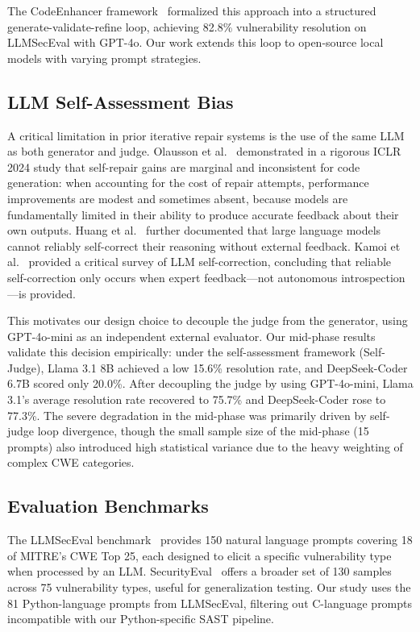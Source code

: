 \documentclass[runningheads]{llncs}
\begin{document}
The CodeEnhancer framework~\cite{lee2026codeenhancer} formalized this approach into a structured generate-validate-refine loop, achieving 82.8\% vulnerability resolution on LLMSecEval with GPT-4o. Our work extends this loop to open-source local models with varying prompt strategies.

\subsection{LLM Self-Assessment Bias}

A critical limitation in prior iterative repair systems is the use of the same LLM as both generator and judge. Olausson et al.~\cite{olausson2024selfrepair} demonstrated in a rigorous ICLR 2024 study that self-repair gains are marginal and inconsistent for code generation: when accounting for the cost of repair attempts, performance improvements are modest and sometimes absent, because models are fundamentally limited in their ability to produce accurate feedback about their own outputs. Huang et al.~\cite{huang2023large} further documented that large language models cannot reliably self-correct their reasoning without external feedback. Kamoi et al.~\cite{kamoi2024when} provided a critical survey of LLM self-correction, concluding that reliable self-correction only occurs when expert feedback---not autonomous introspection---is provided.

This motivates our design choice to decouple the judge from the generator, using GPT-4o-mini as an independent external evaluator. Our mid-phase results validate this decision empirically: under the self-assessment framework (Self-Judge), Llama 3.1 8B achieved a low 15.6\% resolution rate, and DeepSeek-Coder 6.7B scored only 20.0\%. After decoupling the judge by using GPT-4o-mini, Llama 3.1's average resolution rate recovered to 75.7\% and DeepSeek-Coder rose to 77.3\%. The severe degradation in the mid-phase was primarily driven by self-judge loop divergence, though the small sample size of the mid-phase (15 prompts) also introduced high statistical variance due to the heavy weighting of complex CWE categories.

\subsection{Evaluation Benchmarks}

The LLMSecEval benchmark~\cite{tony2023llmseceval} provides 150 natural language prompts covering 18 of MITRE's CWE Top 25, each designed to elicit a specific vulnerability type when processed by an LLM. SecurityEval~\cite{siddiq2022securityeval} offers a broader set of 130 samples across 75 vulnerability types, useful for generalization testing. Our study uses the 81 Python-language prompts from LLMSecEval, filtering out C-language prompts incompatible with our Python-specific SAST pipeline.
\end{document}
